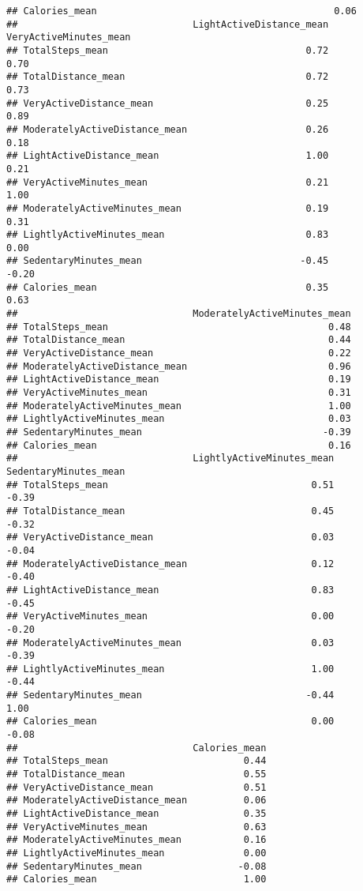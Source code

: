 \documentclass[
]{article}
\begin{document}
\begin{verbatim}
## Calories_mean                                          0.06
##                               LightActiveDistance_mean VeryActiveMinutes_mean
## TotalSteps_mean                                   0.72                   0.70
## TotalDistance_mean                                0.72                   0.73
## VeryActiveDistance_mean                           0.25                   0.89
## ModeratelyActiveDistance_mean                     0.26                   0.18
## LightActiveDistance_mean                          1.00                   0.21
## VeryActiveMinutes_mean                            0.21                   1.00
## ModeratelyActiveMinutes_mean                      0.19                   0.31
## LightlyActiveMinutes_mean                         0.83                   0.00
## SedentaryMinutes_mean                            -0.45                  -0.20
## Calories_mean                                     0.35                   0.63
##                               ModeratelyActiveMinutes_mean
## TotalSteps_mean                                       0.48
## TotalDistance_mean                                    0.44
## VeryActiveDistance_mean                               0.22
## ModeratelyActiveDistance_mean                         0.96
## LightActiveDistance_mean                              0.19
## VeryActiveMinutes_mean                                0.31
## ModeratelyActiveMinutes_mean                          1.00
## LightlyActiveMinutes_mean                             0.03
## SedentaryMinutes_mean                                -0.39
## Calories_mean                                         0.16
##                               LightlyActiveMinutes_mean SedentaryMinutes_mean
## TotalSteps_mean                                    0.51                 -0.39
## TotalDistance_mean                                 0.45                 -0.32
## VeryActiveDistance_mean                            0.03                 -0.04
## ModeratelyActiveDistance_mean                      0.12                 -0.40
## LightActiveDistance_mean                           0.83                 -0.45
## VeryActiveMinutes_mean                             0.00                 -0.20
## ModeratelyActiveMinutes_mean                       0.03                 -0.39
## LightlyActiveMinutes_mean                          1.00                 -0.44
## SedentaryMinutes_mean                             -0.44                  1.00
## Calories_mean                                      0.00                 -0.08
##                               Calories_mean
## TotalSteps_mean                        0.44
## TotalDistance_mean                     0.55
## VeryActiveDistance_mean                0.51
## ModeratelyActiveDistance_mean          0.06
## LightActiveDistance_mean               0.35
## VeryActiveMinutes_mean                 0.63
## ModeratelyActiveMinutes_mean           0.16
## LightlyActiveMinutes_mean              0.00
## SedentaryMinutes_mean                 -0.08
## Calories_mean                          1.00
\end{verbatim}
\end{document}
